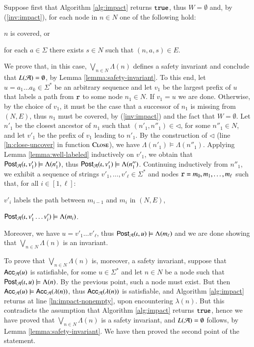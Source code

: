 \documentclass[10pt,conference,letterpaper,twocolumn]{IEEEtran}
\begin{document}
{  Suppose first that Algorithm \ref{alg:impact} returns $\mathtt{true}$, thus
  $W = \emptyset$ and, by (\ref{inv:impact}), for each node in $n \in
  N$ one of the following hold: \begin{compactitem}
  \item $n$ is covered, or
  \item for each $a \in \Sigma$ there exists $s \in N$ such that
    $(n,a,s) \in E$. 
  \end{compactitem}
  We prove that, in this case, $\bigvee_{n \in N} \Lambda(n)$ defines
  a safety invariant and conclude that $L(\mathcal{A}) = \emptyset$, by Lemma
  \ref{lemma:safety-invariant}. To this end, let $u = a_1 \ldots a_k
  \in \Sigma^*$ be an arbitrary sequence and let $v_1$ be the largest
  prefix of $u$ that labels a path from $\mathtt{r}$ to some node $n_1
  \in N$. If $v_1 = u$ we are done. Otherwise, by the choice of $v_1$,
  it must be the case that a successor of $n_1$ is missing from
  $(N,E)$, thus $n_1$ must be covered, by (\ref{inv:impact}) and the
  fact that $W=\emptyset$. Let $n'_1$ be the closest ancestor of $n_1$
  such that $(n'_1,n''_1) \in \lhd$, for some $n''_1 \in N$, and let
  $v'_1$ be the prefix of $v_1$ leading to $n'_1$. By the construction
  of $\lhd$ (line \ref{ln:close-uncover} in function
  $\Call{Close}{}$), we have $\Lambda(n'_1) \models
  \Lambda(n''_1)$. Applying Lemma \ref{lemma:well-labeled} inductively
  on $v'_1$, we obtain that $\mathsf{Post}_{\mathcal{A}}(\iota,v'_1) \models
  \Lambda(n'_1)$, thus $\mathsf{Post}_{\mathcal{A}}(\iota,v'_1) \models \Lambda(n''_1)$.
  Continuing inductively from $n''_1$, we exhibit a sequence of
  strings $v'_1,\ldots,v'_\ell \in \Sigma^*$ and nodes $\mathtt{r} =
  m_0,m_1,\ldots,m_\ell$ such that, for all $i \in
  [1,\ell]$: \begin{compactitem}
  \item $v'_i$ labels the path between $m_{i-1}$ and $m_i$ in $(N,E)$,    
  \item $\mathsf{Post}_{\mathcal{A}}(\iota,v'_1\ldots v'_i) \models \Lambda(m_i)$.
  \end{compactitem}
  Moreover, we have $u = v'_1 \ldots v'_\ell$, thus
  $\mathsf{Post}_{\mathcal{A}}(\iota,u) \models \Lambda(m_\ell)$ and we are done showing
  that $\bigvee_{n\in N} \Lambda(n)$ is an invariant. 

  To prove that $\bigvee_{n \in N} \Lambda(n)$ is, moreover, a safety
  invariant, suppose that $\mathsf{Acc}_{\mathcal{A}}(u)$ is satisfiable, for some $u
  \in \Sigma^*$ and let $n \in N$ be a node such that
  $\mathsf{Post}_{\mathcal{A}}(\iota,u) \models \Lambda(n)$. By the previous point, such
  a node must exist. But then $\mathsf{Acc}_{\mathcal{A}}(u) \models
  \mathsf{Acc}_{\mathcal{A}}(\lambda(n))$, thus $\mathsf{Acc}_{\mathcal{A}}(\lambda(n))$ is
  satisfiable, and Algorithm \ref{alg:impact} returns at line
  \ref{ln:impact-nonempty}, upon encountering $\lambda(n)$. But this
  contradicts the assumption that Algorithm \ref{alg:impact} returns
  $\mathtt{true}$, hence we have proved that $\bigvee_{n \in N} \Lambda(n)$ is
  a safety invariant, and $L(\mathcal{A}) = \emptyset$ follows, by Lemma
  \ref{lemma:safety-invariant}. We have then proved the second point
  of the statement.

}
\end{document}
